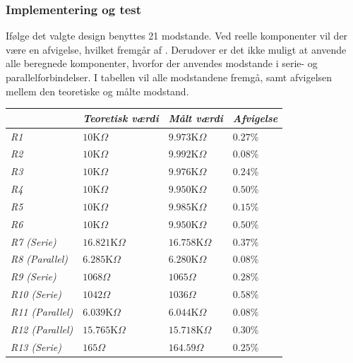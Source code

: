 \subsubsection{Implementering og test}
Ifølge det valgte design benyttes 21 modstande. Ved reelle komponenter vil der være en afvigelse, hvilket fremgår af . Derudover er det ikke muligt at anvende alle beregnede komponenter, hvorfor der anvendes modstande i serie- og parallelforbindelser. I tabellen vil alle modstandene fremgå, samt afvigelsen mellem den teoretiske og målte modstand. 
\begin{table}[H]
\centering
\begin{tabular}{|l|l|l|l|}
\hline
\textit{}               & \textit{Teoretisk værdi} & \textit{Målt værdi} & \textit{Afvigelse} \\ \hline
\textit{R1}             & $10$K$\Omega$            & $9.973$K$\Omega$    & $0.27\%$           \\ \hline
\textit{R2}             & $10$K$\Omega$            & $9.992$K$\Omega$    & $0.08\%$           \\ \hline
\textit{R3}             & $10$K$\Omega$            & $9.976$K$\Omega$    & $0.24\%$           \\ \hline
\textit{R4}             & $10$K$\Omega$            & $9.950$K$\Omega$    & $0.50\%$           \\ \hline
\textit{R5}             & $10$K$\Omega$            & $9.985$K$\Omega$    & $0.15\%$           \\ \hline
\textit{R6}             & $10$K$\Omega$            & $9.950$K$\Omega$    & $0.50\%$           \\ \hline
\textit{R7 (Serie)}     & $16.821$K$\Omega$        & $16.758$K$\Omega$   & $0.37\%$           \\ \hline
\textit{R8 (Parallel)}  & $6.285$K$\Omega$         & $6.280$K$\Omega$    & $0.08\%$           \\ \hline
\textit{R9 (Serie)}     & $1068\Omega$             & $1065\Omega$        & $0.28\%$           \\ \hline
\textit{R10 (Serie)}    & $1042\Omega$             & $1036\Omega$        & $0.58\%$           \\ \hline
\textit{R11 (Parallel)} & $6.039$K$\Omega$         & $6.044$K$\Omega$    & $0.08\%$           \\ \hline
\textit{R12 (Parallel)} & $15.765$K$\Omega$        & $15.718$K$\Omega$   & $0.30\%$           \\ \hline
\textit{R13 (Serie)}    & $165\Omega$              & $164.59\Omega$      & $0.25\%$           \\ \hline

\end{tabular}
\end{table}
